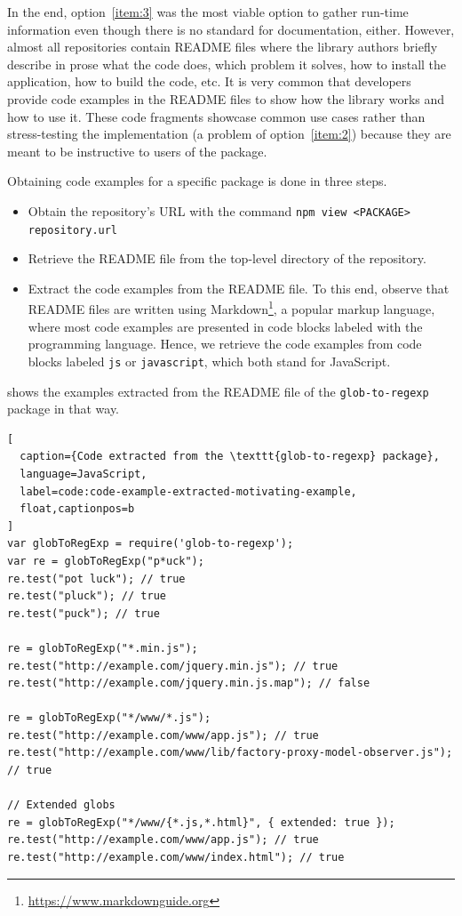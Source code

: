 \documentclass[sigconf]{acmart}
\begin{document}
In the end, option~\ref{item:3} was the most viable option to gather run-time information
even though there is no standard for documentation, either. However, almost all repositories
contain README files where the library authors briefly describe in prose what
the code does, which problem it solves, how to install the
application, how to build the code, etc. It is very common that
developers provide code examples in the README files to show how the
library works and how to use it. These code fragments showcase common use cases rather
than stress-testing the implementation (a problem of
option~\ref{item:2}) because they are meant to be instructive to users of the package.


Obtaining code examples for a specific \NPM{} package is done in three steps.
\begin{itemize}
\item Obtain the  repository's URL with the command
  \texttt{npm view <PACKAGE> repository.url}

\item Retrieve the README file from the top-level directory of the repository.

\item Extract the code examples from the README file. To this end,
  observe that README files are
  written using Markdown\footnote{\url{https://www.markdownguide.org}}, a
  popular markup language, where most
  code examples are presented in code blocks labeled with the programming
  language. Hence, we
  retrieve the code examples from code blocks labeled \texttt{js} or
  \texttt{javascript}, which both stand for JavaScript.
\end{itemize}

 shows
the examples extracted from  the README file of the \texttt{glob-to-regexp} package in
that way.

\begin{lstlisting}[
  caption={Code extracted from the \texttt{glob-to-regexp} package},
  language=JavaScript,
  label=code:code-example-extracted-motivating-example,
  float,captionpos=b
]
var globToRegExp = require('glob-to-regexp');
var re = globToRegExp("p*uck");
re.test("pot luck"); // true
re.test("pluck"); // true
re.test("puck"); // true

re = globToRegExp("*.min.js");
re.test("http://example.com/jquery.min.js"); // true
re.test("http://example.com/jquery.min.js.map"); // false

re = globToRegExp("*/www/*.js");
re.test("http://example.com/www/app.js"); // true
re.test("http://example.com/www/lib/factory-proxy-model-observer.js"); // true

// Extended globs
re = globToRegExp("*/www/{*.js,*.html}", { extended: true });
re.test("http://example.com/www/app.js"); // true
re.test("http://example.com/www/index.html"); // true
\end{lstlisting}
\end{document}
